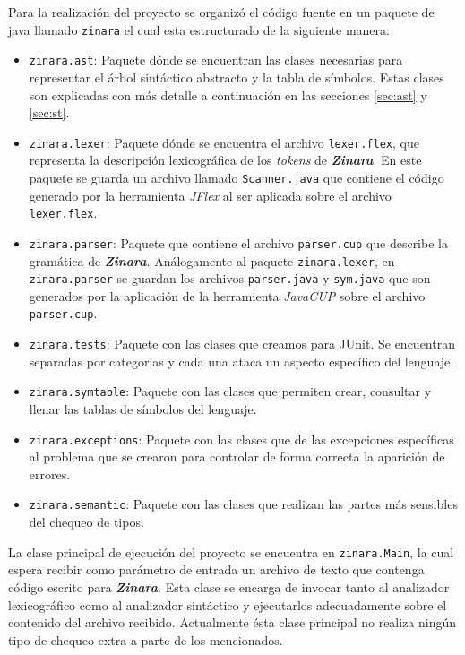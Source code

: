 \documentclass[12pt, spanish]{report}
\begin{document}
Para la realizaci\'on del proyecto se organiz\'o el c\'odigo fuente en
un paquete de java llamado \texttt{zinara} el cual esta estructurado
de la siguiente manera:

\begin{itemize}
\item \texttt{zinara.ast}: Paquete d\'onde se encuentran las clases
  necesarias para representar el \'arbol sint\'actico abstracto y la
  tabla de s\'imbolos. Estas clases son explicadas con m\'as detalle a
  continuaci\'on en las secciones \ref{sec:ast} y \ref{sec:st}.

\item \texttt{zinara.lexer}: Paquete d\'onde se encuentra el archivo
  \texttt{lexer.flex}, que representa la descripci\'on lexicogr\'afica
  de los \emph{tokens} de \emph{\textbf{Zinara}}. En este paquete se
  guarda un archivo llamado \texttt{Scanner.java} que contiene el
  c\'odigo generado por la herramienta \emph{JFlex} al ser aplicada
  sobre el archivo \texttt{lexer.flex}.

\item \texttt{zinara.parser}: Paquete que contiene el archivo
  \texttt{parser.cup} que describe la gram\'atica de
  \emph{\textbf{Zinara}}. An\'alogamente al paquete
  \texttt{zinara.lexer}, en \texttt{zinara.parser} se guardan los
  archivos \texttt{parser.java} y \texttt{sym.java} que son generados
  por la aplicaci\'on de la herramienta \emph{JavaCUP} sobre el
  archivo \texttt{parser.cup}.

\item \texttt{zinara.tests}: Paquete con las clases que creamos para
  JUnit. Se encuentran separadas por categorias y cada una ataca un
  aspecto espec\'ifico del lenguaje.

\item \texttt{zinara.symtable}: Paquete con las clases que permiten
  crear, consultar y llenar las tablas de s\'imbolos del lenguaje.

\item \texttt{zinara.exceptions}: Paquete con las clases que de las
  excepciones espec\'ificas al problema que se crearon para controlar
  de forma correcta la aparici\'on de errores.

\item \texttt{zinara.semantic}: Paquete con las clases que realizan
  las partes m\'as sensibles del chequeo de tipos.


\end{itemize}

La clase principal de ejecuci\'on del proyecto se encuentra en
\texttt{zinara.Main}, la cual espera recibir como par\'ametro de entrada
un archivo de texto que contenga c\'odigo escrito para
\emph{\textbf{Zinara}}. Esta clase se encarga de invocar tanto al
analizador lexicogr\'afico como al analizador sint\'actico y ejecutarlos
adecuadamente sobre el contenido del archivo recibido. Actualmente
\'esta clase principal no realiza ning\'un tipo de chequeo extra a parte
de los mencionados.
\end{document}
